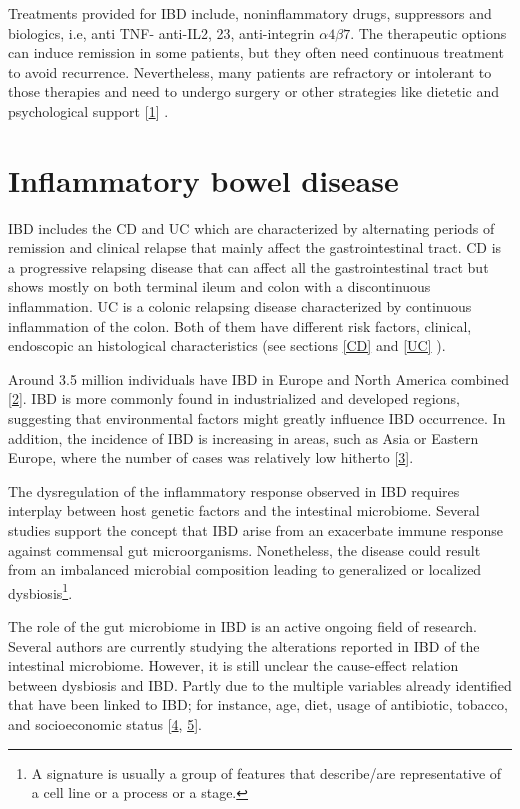 \documentclass[
  12pt,
  a4paper,
  twoside,
  openright]{book}
\begin{document}
Treatments provided for IBD include, noninflammatory drugs, suppressors and biologics, i.e, anti TNF- anti-IL2, 23, anti-integrin \(\alpha4\beta7\).
The therapeutic options can induce remission in some patients, but they often need continuous treatment to avoid recurrence.
Nevertheless, many patients are refractory or intolerant to those therapies and need to undergo surgery or other strategies like dietetic and psychological support {[}\protect\hyperlink{ref-raine2021}{1}{]} .

\hypertarget{IBD}{%
\section{Inflammatory bowel disease}\label{IBD}}

IBD includes the CD and UC which are characterized by alternating periods of remission and clinical relapse that mainly affect the gastrointestinal tract.
CD is a progressive relapsing disease that can affect all the gastrointestinal tract but shows mostly on both terminal ileum and colon with a discontinuous inflammation.
UC is a colonic relapsing disease characterized by continuous inflammation of the colon.
Both of them have different risk factors, clinical, endoscopic an histological characteristics (see sections \ref{CD} and \ref{UC} ).

Around 3.5 million individuals have IBD in Europe and North America combined {[}\protect\hyperlink{ref-jairath2020}{2}{]}.
IBD is more commonly found in industrialized and developed regions, suggesting that environmental factors might greatly influence IBD occurrence.
In addition, the incidence of IBD is increasing in areas, such as Asia or Eastern Europe, where the number of cases was relatively low hitherto {[}\protect\hyperlink{ref-burisch2015}{3}{]}.

The dysregulation of the inflammatory response observed in IBD requires interplay between host genetic factors and the intestinal microbiome.
Several studies support the concept that IBD arise from an exacerbate immune response against commensal gut microorganisms.
Nonetheless, the disease could result from an imbalanced microbial composition leading to generalized or localized dysbiosis\footnote{A signature is usually a group of features that describe/are representative of a cell line or a process or a stage.}.

The role of the gut microbiome in IBD is an active ongoing field of research.
Several authors are currently studying the alterations reported in IBD of the intestinal microbiome.
However, it is still unclear the cause-effect relation between dysbiosis and IBD.
Partly due to the multiple variables already identified that have been linked to IBD; for instance, age, diet, usage of antibiotic, tobacco, and socioeconomic status {[}\protect\hyperlink{ref-humanmicrobiomeprojectconsortium2012}{4}, \protect\hyperlink{ref-shaw2016}{5}{]}.
\end{document}
